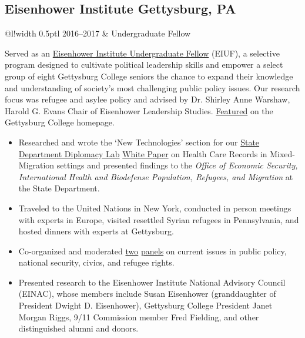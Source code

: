 \documentclass[]{article}
\newcommand\VRule{\color{lightgray}\vrule width 0.5pt}
\begin{document}
\subsection*{Eisenhower Institute \hfill \textnormal{Gettysburg, PA}}
\begin{tabular}{@{}l!{\VRule}l}
{\footnotesize 2016--2017} & Undergraduate Fellow\\
\end{tabular}

Served as an \href{https://www.gettysburg.edu/eisenhower-institute/undergraduate-programs/fellowships/undergraduate-fellows}{Eisenhower Institute Undergraduate Fellow} (EIUF), a selective program designed to cultivate political leadership skills and empower a select group of eight Gettysburg College seniors the chance to expand their knowledge and understanding of society’s most challenging public policy issues. Our research focus was refugee and asylee policy and advised by Dr. Shirley Anne Warshaw, Harold G. Evans Chair of Eisenhower Leadership Studies. \href{https://web.archive.org/web/20190110103806/http://www.gettysburg.edu/news_events/press_release_detail.dot?id=71316287-0fe4-47c3-889b-4fb0b00bac1e}{Featured} on the Gettysburg College homepage.

\begin{itemize}
	\item Researched and wrote the `New Technologies' section for our \href{https://www.state.gov/s/partnerships/ppp/diplab/}{State Department Diplomacy Lab} \href{https://drive.google.com/file/d/0B5fjh9FZOHSYT1dhVF8yYmd4UEk/view?usp=sharing}{White Paper} on Health Care Records in Mixed-Migration settings and presented findings to the \textit{Office of Economic Security, International Health and Biodefense Population, Refugees, and Migration} at the State Department.
	\item Traveled to the United Nations in New York, conducted in person meetings with experts in Europe, visited resettled Syrian refugees in Pennsylvania, and hosted dinners with experts at Gettysburg.
	\item Co-organized and moderated \href{http://cs.gettysburg.edu/~duncjo01/assets/media/EI_panel_f16.pdf}{two} \href{http://cs.gettysburg.edu/~duncjo01/assets/media/EI_panel_s17_second.pdf}{panels} on current issues in public policy, national security, civics, and refugee rights. 
	\item Presented research to the Eisenhower Institute National Advisory Council (EINAC), whose members include Susan Eisenhower (granddaughter of President Dwight D. Eisenhower), Gettysburg College President Janet Morgan Riggs, 9/11 Commission member Fred Fielding, and other distinguished alumni and donors.
\end{itemize}
\end{document}
